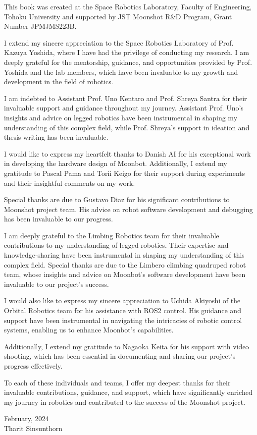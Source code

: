\begin{my_ack}
This book was created at the Space Robotics Laboratory, Faculty of Engineering, Tohoku University and supported by JST Moonshot R\&D Program, Grant Number JPMJMS223B.

I extend my sincere appreciation to the Space Robotics Laboratory of Prof. Kazuya Yoshida, where I have had the privilege of conducting my research. I am deeply grateful for the mentorship, guidance, and opportunities provided by Prof. Yoshida and the lab members, which have been invaluable to my growth and development in the field of robotics.

I am indebted to Assistant Prof. Uno Kentaro and Prof. Shreya Santra for their invaluable support and guidance throughout my journey. Assistant Prof. Uno's insights and advice on legged robotics have been instrumental in shaping my understanding of this complex field, while Prof. Shreya's support in ideation and thesis writing has been invaluable.

I would like to express my heartfelt thanks to Danish AI for his exceptional work in developing the hardware design of Moonbot. Additionally, I extend my gratitude to Pascal Pama and Torii Keigo for their support during experiments and their insightful comments on my work.

Special thanks are due to Gustavo Diaz for his significant contributions to Moonshot project team. His advice on robot software development and debugging has been invaluable to our progress.

I am deeply grateful to the Limbing Robotics team for their invaluable contributions to my understanding of legged robotics. Their expertise and knowledge-sharing have been instrumental in shaping my understanding of this complex field. Special thanks are due to the Limbero climbing quadruped robot team, whose insights and advice on Moonbot's software development have been invaluable to our project's success.

I would also like to express my sincere appreciation to Uchida Akiyoshi of the Orbital Robotics team for his assistance with ROS2 control. His guidance and support have been instrumental in navigating the intricacies of robotic control systems, enabling us to enhance Moonbot's capabilities.

Additionally, I extend my gratitude to Nagaoka Keita for his support with video shooting, which has been essential in documenting and sharing our project's progress effectively.

To each of these individuals and teams, I offer my deepest thanks for their invaluable contributions, guidance, and support, which have significantly enriched my journey in robotics and contributed to the success of the Moonshot project.

\begin{flushright}
February, 2024\\
Tharit Sinsunthorn
\end{flushright}
\end{my_ack}
